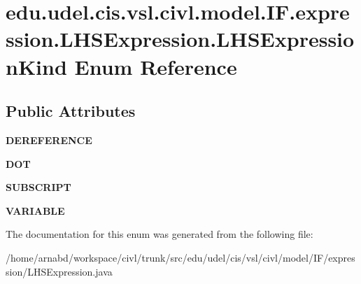 \hypertarget{enumedu_1_1udel_1_1cis_1_1vsl_1_1civl_1_1model_1_1IF_1_1expression_1_1LHSExpression_1_1LHSExpressionKind}{}\section{edu.\+udel.\+cis.\+vsl.\+civl.\+model.\+I\+F.\+expression.\+L\+H\+S\+Expression.\+L\+H\+S\+Expression\+Kind Enum Reference}
\label{enumedu_1_1udel_1_1cis_1_1vsl_1_1civl_1_1model_1_1IF_1_1expression_1_1LHSExpression_1_1LHSExpressionKind}
\subsection*{Public Attributes}
\begin{DoxyCompactItemize}
\item 
\hypertarget{enumedu_1_1udel_1_1cis_1_1vsl_1_1civl_1_1model_1_1IF_1_1expression_1_1LHSExpression_1_1LHSExpressionKind_a1af37cec2b4f13fd6aaacbcd64c3ae59}{}{\bfseries D\+E\+R\+E\+F\+E\+R\+E\+N\+C\+E}\label{enumedu_1_1udel_1_1cis_1_1vsl_1_1civl_1_1model_1_1IF_1_1expression_1_1LHSExpression_1_1LHSExpressionKind_a1af37cec2b4f13fd6aaacbcd64c3ae59}

\item 
\hypertarget{enumedu_1_1udel_1_1cis_1_1vsl_1_1civl_1_1model_1_1IF_1_1expression_1_1LHSExpression_1_1LHSExpressionKind_a7fcf1010e659d99b58bc57d35965a593}{}{\bfseries D\+O\+T}\label{enumedu_1_1udel_1_1cis_1_1vsl_1_1civl_1_1model_1_1IF_1_1expression_1_1LHSExpression_1_1LHSExpressionKind_a7fcf1010e659d99b58bc57d35965a593}

\item 
\hypertarget{enumedu_1_1udel_1_1cis_1_1vsl_1_1civl_1_1model_1_1IF_1_1expression_1_1LHSExpression_1_1LHSExpressionKind_a371de4fb5f56b223d7e1a5426eb65931}{}{\bfseries S\+U\+B\+S\+C\+R\+I\+P\+T}\label{enumedu_1_1udel_1_1cis_1_1vsl_1_1civl_1_1model_1_1IF_1_1expression_1_1LHSExpression_1_1LHSExpressionKind_a371de4fb5f56b223d7e1a5426eb65931}

\item 
\hypertarget{enumedu_1_1udel_1_1cis_1_1vsl_1_1civl_1_1model_1_1IF_1_1expression_1_1LHSExpression_1_1LHSExpressionKind_ae901ee0a5446c0d4840aa8816c730b4f}{}{\bfseries V\+A\+R\+I\+A\+B\+L\+E}\label{enumedu_1_1udel_1_1cis_1_1vsl_1_1civl_1_1model_1_1IF_1_1expression_1_1LHSExpression_1_1LHSExpressionKind_ae901ee0a5446c0d4840aa8816c730b4f}

\end{DoxyCompactItemize}


The documentation for this enum was generated from the following file\+:\begin{DoxyCompactItemize}
\item 
/home/arnabd/workspace/civl/trunk/src/edu/udel/cis/vsl/civl/model/\+I\+F/expression/L\+H\+S\+Expression.\+java\end{DoxyCompactItemize}
